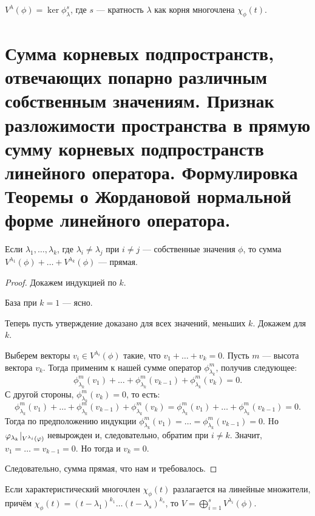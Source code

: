 \begin{Consequence}
	$V^{\lambda}(\phi) = \ker\phi^s_\lambda$, где $s$ --- кратность $\lambda$ как корня многочлена $\chi_\phi(t)$.
\end{Consequence}

\section{Сумма корневых подпространств, отвечающих попарно различным собственным значениям. Признак разложимости пространства в прямую сумму корневых подпространств линейного оператора. Формулировка Теоремы о Жордановой нормальной форме линейного оператора.}

\begin{Suggestion}
	Если $\lambda_1, \ldots, \lambda_k$, где $\lambda_i \neq \lambda_j$ при $i \neq j$ --- собственные значения $\phi$, то сумма $V^{\lambda_1}(\phi) + \ldots + V^{\lambda_k}(\phi)$ --- прямая.
\end{Suggestion}

\begin{proof}
	Докажем индукцией по $k$.
	
	База при $k = 1$ --- ясно.
	
	Теперь пусть утверждение доказано для всех значений, меньших $k$. Докажем для $k$.
	
	Выберем векторы $v_i \in V^{\lambda_i}(\phi)$ такие, что $v_1 + \ldots + v_k = 0$. Пусть $m$ --- высота вектора $v_k$. Тогда применим к нашей сумме оператор $\phi^m_{\lambda_k}$, получив следующее:
	\[
	\phi^m_{\lambda_k}(v_1) + \ldots + \phi^m_{\lambda_k}(v_{k-1}) + \phi^m_{\lambda_k}(v_k) = 0.
	\]
	С другой стороны, $ \phi^m_{\lambda_k}(v_k) = 0$, то есть:
	\[
	\phi^m_{\lambda_k}(v_1) + \ldots + \phi^m_{\lambda_k}(v_{k-1}) + \phi^m_{\lambda_k}(v_k) = \phi^m_{\lambda_k}(v_1) + \ldots + \phi^m_{\lambda_k}(v_{k-1}) = 0.
	\]
	Тогда по предположению индукции $\phi^m_{\lambda_k}(v_1) = \ldots = \phi^m_{\lambda_k}(v_{k-1}) = 0$. Hо
	$ {\varphi_{\lambda_k}}\negmedspace\mid_{V^{\lambda_i}(\varphi)}$ невырожден и, следовательно, обратим при $i \neq k$. Значит, $v_1 = \ldots = v_{k-1} = 0$. Но тогда и $v_k = 0$. 
	
	Следовательно, сумма прямая, что нам и требовалось.
\end{proof}

\begin{Theorem}
	Если характеристический многочлен $\chi_\phi(t)$ разлагается на линейные множители, причём $\chi_\phi(t) = (t - \lambda_1)^{k_1}\ldots(t - \lambda_s)^{k_s}$, то $V = \bigoplus_{i = 1}^s  V^{\lambda_i}(\phi)$.
\end{Theorem}

